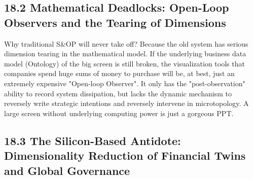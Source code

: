 \documentclass[11pt,a4paper]{article}
\begin{document}
\subsection*{18.2 Mathematical Deadlocks: Open-Loop Observers and the Tearing of Dimensions}


Why traditional S\&OP will never take off? Because the old system has serious dimension tearing in the mathematical model. If the underlying business data model (Ontology) of the big screen is still broken, the visualization tools that companies spend huge sums of money to purchase will be, at best, just an extremely expensive "Open-loop Observer". It only has the "post-observation" ability to record system dissipation, but lacks the dynamic mechanism to reversely write strategic intentions and reversely intervene in microtopology. A large screen without underlying computing power is just a gorgeous PPT.


\subsection*{18.3 The Silicon-Based Antidote: Dimensionality Reduction of Financial Twins and Global Governance}
\end{document}
